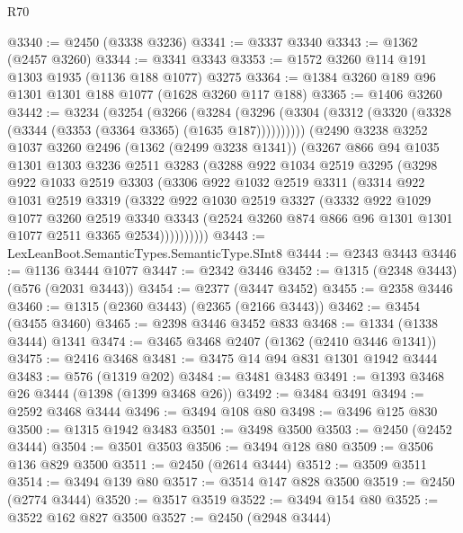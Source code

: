 \begin{lexlean}{R70}
\begin{coremodule}
@3340 := @2450 (@3338 @3236)
@3341 := @3337 @3340
@3343 := @1362 (@2457 @3260)
@3344 := @3341 @3343
@3353 := @1572 @3260 @114 @191 @1303 @1935 (@1136 @188 @1077) @3275
@3364 := @1384 @3260 @189 @96 @1301 @1301 @188 @1077 (@1628 @3260 @117 @188)
@3365 := @1406 @3260
@3442 := @3234
    (@3254
      (@3266
        (@3284 (@3296 (@3304 (@3312 (@3320 (@3328 (@3344 (@3353 (@3364 @3365) (@1635 @187))))))))))
      (@2490
        @3238
        @3252
        @1037
        @3260
        @2496
        (@1362 (@2499 @3238 @1341))
        (@3267
          @866
          @94
          @1035
          @1301
          @1303
          @3236
          @2511
          @3283
          (@3288
            @922
            @1034
            @2519
            @3295
            (@3298
              @922
              @1033
              @2519
              @3303
              (@3306
                @922
                @1032
                @2519
                @3311
                (@3314
                  @922
                  @1031
                  @2519
                  @3319
                  (@3322
                    @922
                    @1030
                    @2519
                    @3327
                    (@3332
                      @922
                      @1029
                      @1077
                      @3260
                      @2519
                      @3340
                      @3343
                      (@2524 @3260 @874 @866 @96 @1301 @1301 @1077 @2511 @3365 @2534))))))))))
@3443 := LexLeanBoot.SemanticTypes.SemanticType.SInt8
@3444 := @2343 @3443
@3446 := @1136 @3444 @1077
@3447 := @2342 @3446
@3452 := @1315 (@2348 @3443) (@576 (@2031 @3443))
@3454 := @2377 (@3447 @3452)
@3455 := @2358 @3446
@3460 := @1315 (@2360 @3443) (@2365 (@2166 @3443))
@3462 := @3454 (@3455 @3460)
@3465 := @2398 @3446 @3452 @833
@3468 := @1334 (@1338 @3444) @1341
@3474 := @3465 @3468 @2407 (@1362 (@2410 @3446 @1341))
@3475 := @2416 @3468
@3481 := @3475 @14 @94 @831 @1301 @1942 @3444
@3483 := @576 (@1319 @202)
@3484 := @3481 @3483
@3491 := @1393 @3468 @26 @3444 (@1398 (@1399 @3468 @26))
@3492 := @3484 @3491
@3494 := @2592 @3468 @3444
@3496 := @3494 @108 @80
@3498 := @3496 @125 @830
@3500 := @1315 @1942 @3483
@3501 := @3498 @3500
@3503 := @2450 (@2452 @3444)
@3504 := @3501 @3503
@3506 := @3494 @128 @80
@3509 := @3506 @136 @829 @3500
@3511 := @2450 (@2614 @3444)
@3512 := @3509 @3511
@3514 := @3494 @139 @80
@3517 := @3514 @147 @828 @3500
@3519 := @2450 (@2774 @3444)
@3520 := @3517 @3519
@3522 := @3494 @154 @80
@3525 := @3522 @162 @827 @3500
@3527 := @2450 (@2948 @3444)

\end{coremodule}
\end{lexlean}
